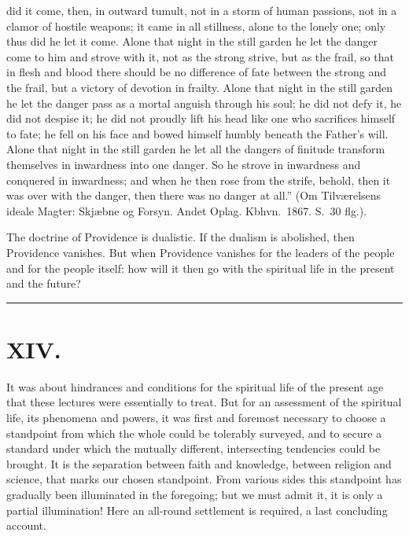 \documentclass[12pt]{book}
\newcommand{\opage}[1]{\marginnote{\footnotesize\textit{[#1]}}}
\begin{document}
did it come, then, in outward tumult, not in a storm of human passions,
not in a clamor of hostile weapons; it came in all stillness, alone to
the lonely one; only thus did he let it come. Alone that night in the
still garden he let the danger come to him and strove with it, not as
the strong strive, but as the frail, so that in flesh and blood there
should be no difference of fate between the strong and the frail, but a
victory of devotion in frailty. Alone that night in the still garden he
let the danger pass as a mortal anguish through his soul; he did not
defy it, he did not despise it; he did not proudly lift his head like
one who sacrifices himself to fate; he fell on his
\opage{224}\setcounter{footnote}{0}%
face and bowed himself humbly beneath the Father's will. Alone that
night in the still garden he let all the dangers of finitude transform
themselves in inwardness into one danger. So he strove in inwardness and
conquered in inwardness; and when he then rose from the strife, behold,
then it was over with the danger, then there was no danger at all.''
(Om Tilværelsens ideale Magter: Skjæbne og Forsyn. Andet Oplag.
Kbhvn.\ 1867. S.~30 flg.).

The doctrine of Providence is dualistic. If the dualism is abolished,
then Providence vanishes. But when Providence vanishes for the leaders
of the people and for the people itself: how will it then go with the
spiritual life in the present and the future?

\begin{center}\rule{3cm}{0.4pt}\end{center}

\chapter*{XIV.}
\label{ch:xiv}
\opage{225}\setcounter{footnote}{0}%
It was about hindrances and conditions for the spiritual life of the
present age that these lectures were essentially to treat. But for an
assessment of the spiritual life, its phenomena and powers, it was
first and foremost necessary to choose a standpoint from which the whole
could be tolerably surveyed, and to secure a standard under which the
mutually different, intersecting tendencies could be brought. It is the
separation between faith and knowledge, between religion and science,
that marks our chosen standpoint. From various sides this standpoint has
gradually been illuminated in the foregoing; but we must admit it, it is
only a partial illumination! Here an all-round settlement is required, a
last concluding account.
\end{document}
